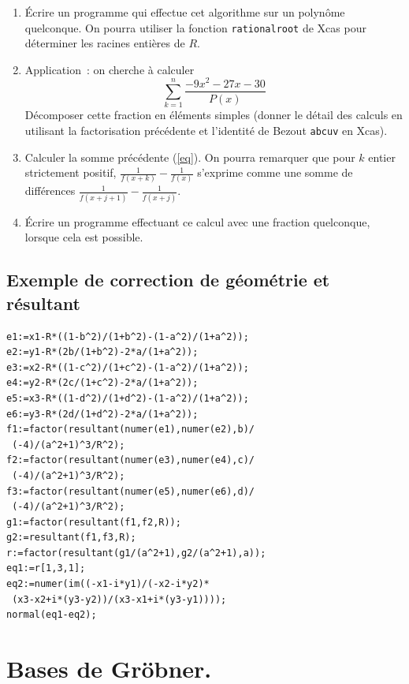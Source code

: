 \documentclass[a4paper,11pt]{article}
\begin{document}
\begin{giacjshere}
\begin{enumerate}
\[P(x)=x^6+9x^5+29x^4+41x^3+37 x^2+59x+31\]
Montrer que $P$ a la propriété ${\mathcal I}$. Calculer
la ou les racines entières de $R$ et donner la factorisation
correspondante de $P$. 
\item \'Ecrire un programme qui effectue cet algorithme sur un
polyn\^ome quelconque. On pourra utiliser la fonction 
\verb|rationalroot| de Xcas pour d\'eterminer les racines
enti\`eres de $R$.
\item Application~: on cherche \`a calculer
\begin{equation} \label{eq}
 \sum_{k=1}^n \frac{-9x^2-27x-30}{P(x)}
\end{equation}
D\'ecomposer cette fraction
en \'el\'ements simples (donner le d\'etail des calculs en utilisant
la factorisation pr\'ec\'edente et l'identit\'e de Bezout 
\verb|abcuv| en Xcas). 
\item Calculer la somme pr\'ec\'edente (\ref{eq}).
On pourra remarquer que pour $k$ entier strictement positif,
$\frac{1}{f(x+k)}-\frac{1}{f(x)}$
s'exprime comme une somme de diff\'erences  
$\frac{1}{f(x+j+1)}-\frac{1}{f(x+j)}$.
\item \'Ecrire un programme effectuant ce calcul avec une fraction
quelconque, lorsque cela est possible.
\end{enumerate}

\pagebreak

\subsection{Exemple de correction de g\'eom\'etrie et r\'esultant}
\begin{verbatim}
e1:=x1-R*((1-b^2)/(1+b^2)-(1-a^2)/(1+a^2));
e2:=y1-R*(2b/(1+b^2)-2*a/(1+a^2));
e3:=x2-R*((1-c^2)/(1+c^2)-(1-a^2)/(1+a^2));
e4:=y2-R*(2c/(1+c^2)-2*a/(1+a^2));
e5:=x3-R*((1-d^2)/(1+d^2)-(1-a^2)/(1+a^2));
e6:=y3-R*(2d/(1+d^2)-2*a/(1+a^2));
f1:=factor(resultant(numer(e1),numer(e2),b)/
 (-4)/(a^2+1)^3/R^2);
f2:=factor(resultant(numer(e3),numer(e4),c)/
 (-4)/(a^2+1)^3/R^2);
f3:=factor(resultant(numer(e5),numer(e6),d)/
 (-4)/(a^2+1)^3/R^2);
g1:=factor(resultant(f1,f2,R));
g2:=resultant(f1,f3,R);
r:=factor(resultant(g1/(a^2+1),g2/(a^2+1),a));
eq1:=r[1,3,1];
eq2:=numer(im((-x1-i*y1)/(-x2-i*y2)*
 (x3-x2+i*(y3-y2))/(x3-x1+i*(y3-y1))));
normal(eq1-eq2);
\end{verbatim}

\section{Bases de Gr\"obner.} \label{sec:groebner}  

\end{giacjshere}
\end{document}
